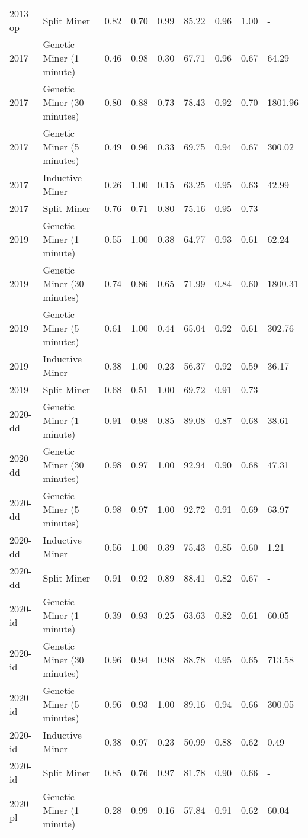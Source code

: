 \begin{tabular}{llrrrrrrl}
2013-op & Split Miner & 0.82 & 0.70 & 0.99 & 85.22 & 0.96 & 1.00 & - \\
2017 & Genetic Miner (1 minute) & 0.46 & 0.98 & 0.30 & 67.71 & 0.96 & 0.67 & 64.29 \\
2017 & Genetic Miner (30 minutes) & 0.80 & 0.88 & 0.73 & 78.43 & 0.92 & 0.70 & 1801.96 \\
2017 & Genetic Miner (5 minutes) & 0.49 & 0.96 & 0.33 & 69.75 & 0.94 & 0.67 & 300.02 \\
2017 & Inductive Miner & 0.26 & 1.00 & 0.15 & 63.25 & 0.95 & 0.63 & 42.99 \\
2017 & Split Miner & 0.76 & 0.71 & 0.80 & 75.16 & 0.95 & 0.73 & - \\
2019 & Genetic Miner (1 minute) & 0.55 & 1.00 & 0.38 & 64.77 & 0.93 & 0.61 & 62.24 \\
2019 & Genetic Miner (30 minutes) & 0.74 & 0.86 & 0.65 & 71.99 & 0.84 & 0.60 & 1800.31 \\
2019 & Genetic Miner (5 minutes) & 0.61 & 1.00 & 0.44 & 65.04 & 0.92 & 0.61 & 302.76 \\
2019 & Inductive Miner & 0.38 & 1.00 & 0.23 & 56.37 & 0.92 & 0.59 & 36.17 \\
2019 & Split Miner & 0.68 & 0.51 & 1.00 & 69.72 & 0.91 & 0.73 & - \\
2020-dd & Genetic Miner (1 minute) & 0.91 & 0.98 & 0.85 & 89.08 & 0.87 & 0.68 & 38.61 \\
2020-dd & Genetic Miner (30 minutes) & 0.98 & 0.97 & 1.00 & 92.94 & 0.90 & 0.68 & 47.31 \\
2020-dd & Genetic Miner (5 minutes) & 0.98 & 0.97 & 1.00 & 92.72 & 0.91 & 0.69 & 63.97 \\
2020-dd & Inductive Miner & 0.56 & 1.00 & 0.39 & 75.43 & 0.85 & 0.60 & 1.21 \\
2020-dd & Split Miner & 0.91 & 0.92 & 0.89 & 88.41 & 0.82 & 0.67 & - \\
2020-id & Genetic Miner (1 minute) & 0.39 & 0.93 & 0.25 & 63.63 & 0.82 & 0.61 & 60.05 \\
2020-id & Genetic Miner (30 minutes) & 0.96 & 0.94 & 0.98 & 88.78 & 0.95 & 0.65 & 713.58 \\
2020-id & Genetic Miner (5 minutes) & 0.96 & 0.93 & 1.00 & 89.16 & 0.94 & 0.66 & 300.05 \\
2020-id & Inductive Miner & 0.38 & 0.97 & 0.23 & 50.99 & 0.88 & 0.62 & 0.49 \\
2020-id & Split Miner & 0.85 & 0.76 & 0.97 & 81.78 & 0.90 & 0.66 & - \\
2020-pl & Genetic Miner (1 minute) & 0.28 & 0.99 & 0.16 & 57.84 & 0.91 & 0.62 & 60.04 \\

\end{tabular}

